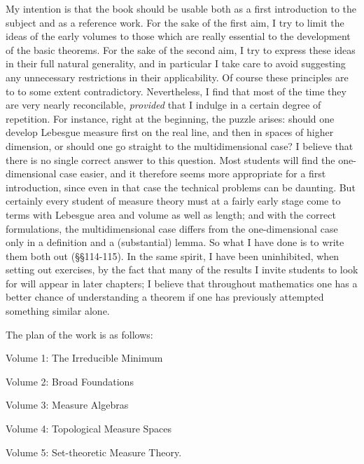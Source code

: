 My intention is that the book should be usable both as a first
introduction to the subject and as a reference work.   For the sake of
the first aim, I try to limit the ideas of the early volumes to those
which are really essential to the development of the basic theorems.
For the sake of the second aim, I try to express these ideas in their
full natural generality, and in particular I take care to avoid
suggesting any unnecessary restrictions in their applicability.   Of
course these principles are to to some extent contradictory.
Nevertheless, I find that most of the time they are very nearly
reconcilable, {\it provided} that I indulge in a certain degree of
repetition.   For instance, right at the beginning, the puzzle arises:
should one develop Lebesgue measure first on the real line, and then in
spaces of higher dimension, or should one go straight to the
multidimensional case?   I believe that there is no single correct
answer to this question.   Most students will find the one-dimensional
case easier, and it therefore seems more appropriate for a first
introduction, since even in that case the technical problems can be
daunting.   But certainly every student of measure theory must at a
fairly early stage
come to terms with Lebesgue area and volume as well as length;
and with the correct formulations, the multidimensional case differs
from the one-dimensional case only in a definition and a (substantial)
lemma.   So what I have done is to write them both out (\S\S114-115).
In the same spirit, I have been uninhibited, when setting out exercises,
by the fact that many of the results I invite students to look for will
appear in later chapters;  I believe that throughout mathematics one has
a better chance of understanding a theorem if one has previously
attempted something similar alone.
     
The plan of the work is as follows:
     
\medskip
     
\qquad\qquad Volume 1:  The Irreducible Minimum
     
\qquad\qquad Volume 2:  Broad Foundations
     
\qquad\qquad Volume 3:  Measure Algebras
     
\qquad\qquad Volume 4:  Topological Measure Spaces
     
\qquad\qquad Volume 5:  Set-theoretic Measure Theory.
     
\medskip
     
